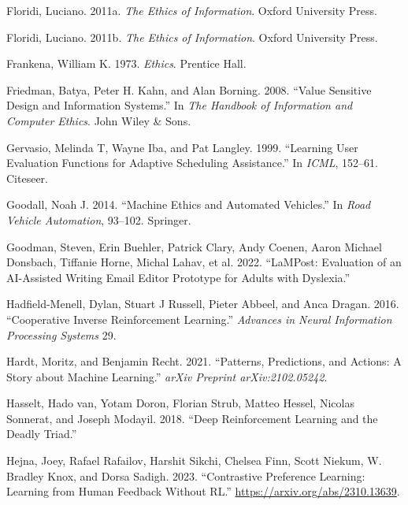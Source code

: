 \documentclass[
  letterpaper,
  DIV=11,
  numbers=noendperiod,
  oneside]{scrreprt}
\newlength{\cslhangindent}
\newenvironment{CSLReferences}[2] %
 {\begin{list}{}{%
  \setlength{\itemindent}{0pt}
  \setlength{\leftmargin}{0pt}
  \setlength{\parsep}{0pt}
  \ifodd #1
   \setlength{\leftmargin}{\cslhangindent}
   \setlength{\itemindent}{-1\cslhangindent}
  \fi
  \setlength{\itemsep}{#2\baselineskip}}}
 {\end{list}}
\theoremstyle{remark}
\begin{document}
\begin{CSLReferences}{1}{0}
Floridi, Luciano. 2011a. \emph{The Ethics of Information}. Oxford
University Press.

Floridi, Luciano. 2011b. \emph{The Ethics of Information}. Oxford
University Press.

Frankena, William K. 1973. \emph{Ethics}. Prentice Hall.

Friedman, Batya, Peter H. Kahn, and Alan Borning. 2008. {``Value
Sensitive Design and Information Systems.''} In \emph{The Handbook of
Information and Computer Ethics}. John Wiley \& Sons.

Gervasio, Melinda T, Wayne Iba, and Pat Langley. 1999. {``Learning User
Evaluation Functions for Adaptive Scheduling Assistance.''} In
\emph{ICML}, 152--61. Citeseer.

Goodall, Noah J. 2014. {``Machine Ethics and Automated Vehicles.''} In
\emph{Road Vehicle Automation}, 93--102. Springer.

Goodman, Steven, Erin Buehler, Patrick Clary, Andy Coenen, Aaron Michael
Donsbach, Tiffanie Horne, Michal Lahav, et al. 2022. {``LaMPost:
Evaluation of an AI-Assisted Writing Email Editor Prototype for Adults
with Dyslexia.''}

Hadfield-Menell, Dylan, Stuart J Russell, Pieter Abbeel, and Anca
Dragan. 2016. {``Cooperative Inverse Reinforcement Learning.''}
\emph{Advances in Neural Information Processing Systems} 29.

Hardt, Moritz, and Benjamin Recht. 2021. {``Patterns, Predictions, and
Actions: A Story about Machine Learning.''} \emph{arXiv Preprint
arXiv:2102.05242}.

Hasselt, Hado van, Yotam Doron, Florian Strub, Matteo Hessel, Nicolas
Sonnerat, and Joseph Modayil. 2018. {``Deep Reinforcement Learning and
the Deadly Triad.''}

Hejna, Joey, Rafael Rafailov, Harshit Sikchi, Chelsea Finn, Scott
Niekum, W. Bradley Knox, and Dorsa Sadigh. 2023. {``Contrastive
Preference Learning: Learning from Human Feedback Without RL.''}
\url{https://arxiv.org/abs/2310.13639}.


\end{CSLReferences}
\end{document}
